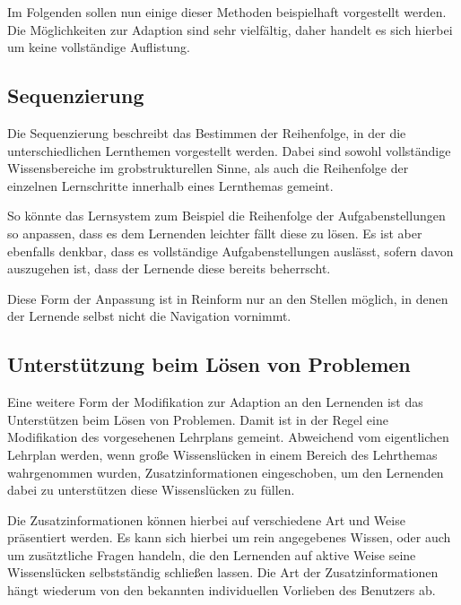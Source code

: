 Im Folgenden sollen nun einige dieser Methoden beispielhaft vorgestellt werden.
Die Möglichkeiten zur Adaption sind sehr vielfältig,
daher handelt es sich hierbei um keine vollständige Auflistung.

\subsection{Sequenzierung}
Die Sequenzierung beschreibt das Bestimmen der Reihenfolge, in der die unterschiedlichen Lernthemen vorgestellt werden.
Dabei sind sowohl vollständige Wissensbereiche im grobstrukturellen Sinne, als auch die Reihenfolge
der einzelnen Lernschritte innerhalb eines Lernthemas gemeint.

So könnte das Lernsystem zum Beispiel die
Reihenfolge der Aufgabenstellungen so anpassen, dass es dem Lernenden leichter fällt diese zu lösen. Es ist aber ebenfalls denkbar,
dass es vollständige Aufgabenstellungen auslässt, sofern davon auszugehen ist, dass der Lernende diese bereits beherrscht.

Diese Form der Anpassung ist in Reinform nur an den Stellen möglich, in denen der Lernende selbst nicht die Navigation vornimmt.

\subsection{Unterstützung beim Lösen von Problemen}
Eine weitere Form der Modifikation zur Adaption an den Lernenden ist das Unterstützen beim Lösen von Problemen.
Damit ist in der Regel eine Modifikation des vorgesehenen Lehrplans gemeint. Abweichend vom eigentlichen Lehrplan
werden, wenn große Wissenslücken in einem Bereich des Lehrthemas wahrgenommen wurden, Zusatzinformationen eingeschoben,
um den Lernenden dabei zu unterstützen diese Wissenslücken zu füllen.

Die Zusatzinformationen können hierbei auf verschiedene Art und Weise
präsentiert werden. Es kann sich hierbei um rein angegebenes Wissen, oder auch um zusätztliche Fragen handeln, die den Lernenden
auf aktive Weise seine Wissenslücken selbstständig schließen lassen. Die Art der Zusatzinformationen hängt wiederum von den
bekannten individuellen Vorlieben des Benutzers ab.

